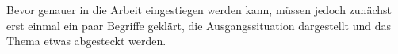 Bevor genauer in die Arbeit eingestiegen werden kann, müssen jedoch zunächst erst einmal ein paar Begriffe geklärt, die Ausgangssituation dargestellt und das Thema etwas abgesteckt werden.









